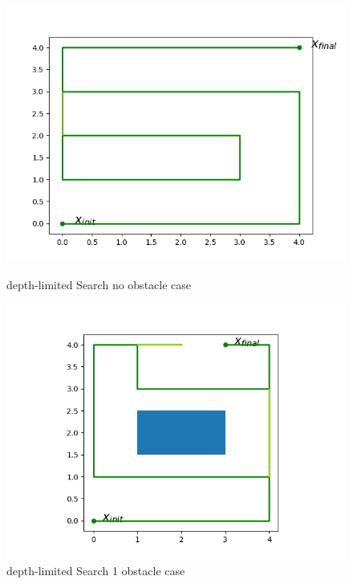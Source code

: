 \documentclass{article}
\begin{document}
\begin{normalsize}
\begin{figure}
\begin{minipage}{.33\textwidth}
      \includegraphics[width=\linewidth]{deliverables/DLS_no_obs.png}
      \caption{depth-limited Search no obstacle case }
    \end{minipage}%
    \begin{minipage}{.33\textwidth}
      \centering
      \includegraphics[width=\linewidth]{deliverables/DLS_1_obs.png}
      \caption{depth-limited Search 1 obstacle case }
    \end{minipage}%
        \begin{minipage}{.33\textwidth}
      \centering

\end{minipage}
\end{figure}
\end{normalsize}
\end{document}

